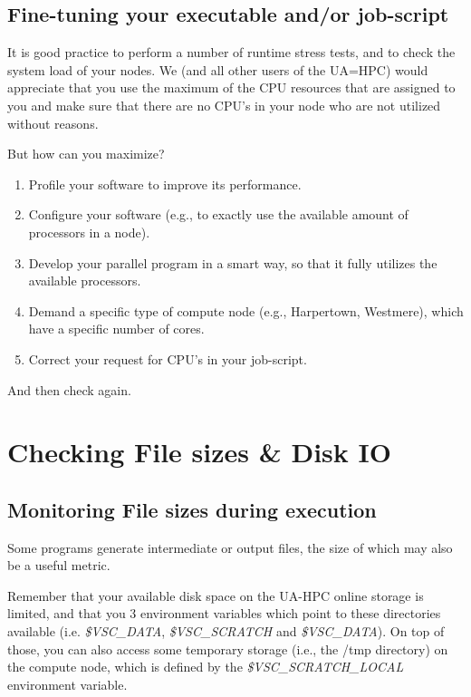 \subsection{Fine-tuning your executable and/or job-script}

It is good practice to perform a number of runtime stress tests, and to check the system load of your nodes. We (and all other users of the UA=HPC) would appreciate that you use the maximum of the CPU resources that are assigned to you and make sure that there are no CPU's in your node who are not utilized without reasons.

But how can you maximize?

\begin{enumerate}
\item  Profile your software to improve its performance.
\item  Configure your software (e.g., to exactly use the available amount of processors in a node).
\item  Develop your parallel program in a smart way, so that it fully utilizes the available processors.
\item  Demand a specific type of compute node (e.g., Harpertown, Westmere), which have a specific number of cores.
\item  Correct your request for CPU's in your job-script.
\end{enumerate}

And then check again.

\section{Checking File sizes \& Disk IO}

\subsection{Monitoring File sizes during execution}

Some programs generate intermediate or output files, the size of which may also be a useful metric.

Remember that your available disk space on the UA-HPC online storage is limited, and that you 3 environment variables which point to these directories available (i.e. \textit{\$VSC\_DATA}, \textit{\$VSC\_SCRATCH} and \textit{\$VSC\_DATA}). On top of those, you can also access some temporary storage (i.e., the /tmp directory) on the compute node, which is defined by the \textit{\$VSC\_SCRATCH\_LOCAL} environment variable.

